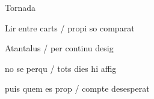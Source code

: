 \documentclass[12pt]{article}
\begin{document}
\begin{estrofaExtra}%




\begin{tornada}

\pagina{[86r]} Tornada

\end{tornada}


\end{estrofaExtra}


\begin{estrofa}

 Lir entre carts / propi so comparat

 Atantalus / per continu desig

 no se perqu / tots dies hi affig

 puis quem es prop / compte desesperat

\end{estrofa}
\end{document}
